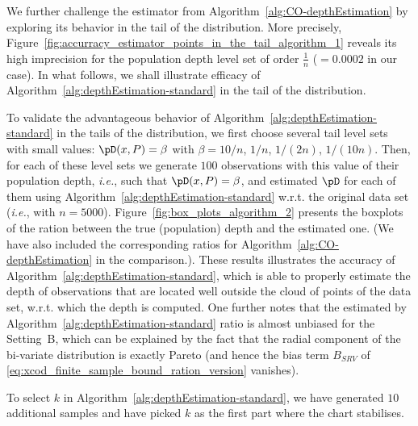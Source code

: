 \documentclass{article}
\numberwithin{equation}{section}
\begin{document}
We further challenge the estimator from Algorithm~\ref{alg:CO-depthEstimation} by exploring its behavior in the tail of the distribution. More precisely, Figure~\ref{fig:accurracy_estimator_points_in_the_tail_algorithm_1} reveals its high imprecision for the population depth level set of order $\frac{1}{n}$ ($=0.0002$ in our case). In what follows, we shall illustrate efficacy of Algorithm~\ref{alg:depthEstimation-standard} in the tail of the distribution.

To validate the advantageous behavior of Algorithm~\ref{alg:depthEstimation-standard} in the tails of the distribution, we first choose several tail level sets with small values: $\pD(x,P)=\beta$ with $\beta = 10/n$, $1/n$, $1/(2n)$, $1/(10n)$. Then, for each of these level sets we generate $100$ observations with this value of their population depth, \textit{i.e.}, such that $\pD(x,P)=\beta$, and estimated $\pD$ for each of them using Algorithm~\ref{alg:depthEstimation-standard} w.r.t. the original data set (\textit{i.e.}, with $n=5 000$). Figure~\ref{fig:box_plots_algorithm_2} presents the boxplots of the ration between the true (population) depth and the estimated one. (We have also included the corresponding ratios for Algorithm~\ref{alg:CO-depthEstimation} in the comparison.). These results illustrates the accuracy of Algorithm~\ref{alg:depthEstimation-standard}, which is able to properly estimate the depth of observations that are located well outside the cloud of points of the data set, w.r.t. which the depth is computed. One further notes that the estimated by Algorithm~\ref{alg:depthEstimation-standard} ratio is almost unbiased for the Setting~B, which can be explained by the fact that the radial component of the bi-variate distribution is exactly Pareto (and hence the bias term \(B_{SRV}\) of
\eqref{eq:xcod_finite_sample_bound_ration_version} vanishes).

To select $k$ in Algorithm~\ref{alg:depthEstimation-standard},
we have generated $10$ additional samples and have picked
$k$ as the first part where the chart stabilises.
\end{document}
